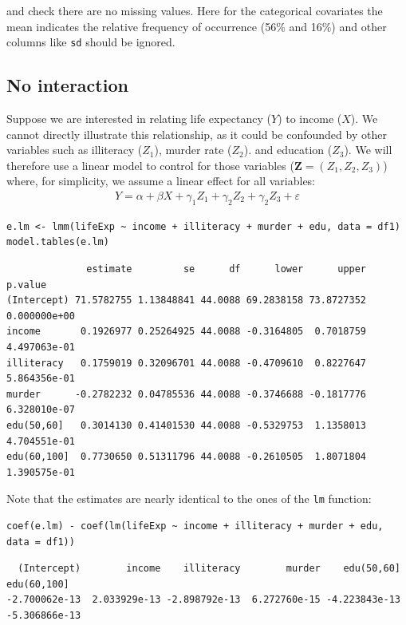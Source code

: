 \documentclass[12pt]{article}
\newcommand{\VZ}{\boldsymbol{Z}}
\begin{document}
and check there are no missing values. Here for the categorical
covariates the mean indicates the relative frequency of occurrence
(56\% and 16\%) and other columns like \texttt{sd} should be ignored.

\subsection{No interaction}
\label{sec:org98082ae}

Suppose we are interested in relating life expectancy (\(Y\)) to
income (\(X\)). We cannot directly illustrate this relationship, as it
could be confounded by other variables such as illiteracy (\(Z_1\)),
murder rate (\(Z_2\)). and education (\(Z_3\)). We will therefore use
a linear model to control for those variables (\(\VZ=(Z_1,Z_2,Z_3)\))
where, for simplicity, we assume a linear effect for all variables:
\begin{align*}
Y = \alpha + \beta X + \gamma_1 Z_1 + \gamma_2 Z_2 + \gamma_2 Z_3 + \varepsilon
\end{align*}
\lstset{language=r,label= ,caption= ,captionpos=b,numbers=none}
\begin{lstlisting}
e.lm <- lmm(lifeExp ~ income + illiteracy + murder + edu, data = df1)
model.tables(e.lm)
\end{lstlisting}

\begin{verbatim}
              estimate         se      df      lower      upper      p.value
(Intercept) 71.5782755 1.13848841 44.0088 69.2838158 73.8727352 0.000000e+00
income       0.1926977 0.25264925 44.0088 -0.3164805  0.7018759 4.497063e-01
illiteracy   0.1759019 0.32096701 44.0088 -0.4709610  0.8227647 5.864356e-01
murder      -0.2782232 0.04785536 44.0088 -0.3746688 -0.1817776 6.328010e-07
edu(50,60]   0.3014130 0.41401530 44.0088 -0.5329753  1.1358013 4.704551e-01
edu(60,100]  0.7730650 0.51311796 44.0088 -0.2610505  1.8071804 1.390575e-01
\end{verbatim}


Note that the estimates are nearly identical to the ones of the \texttt{lm}
function:
\lstset{language=r,label= ,caption= ,captionpos=b,numbers=none}
\begin{lstlisting}
coef(e.lm) - coef(lm(lifeExp ~ income + illiteracy + murder + edu, data = df1))
\end{lstlisting}

\begin{verbatim}
  (Intercept)        income    illiteracy        murder    edu(50,60]   edu(60,100] 
-2.700062e-13  2.033929e-13 -2.898792e-13  6.272760e-15 -4.223843e-13 -5.306866e-13
\end{verbatim}
\end{document}
